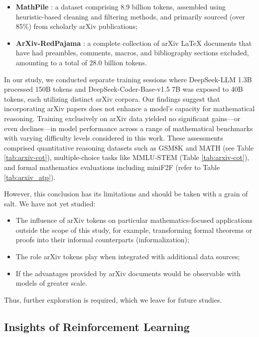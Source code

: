 \begin{itemize}[topsep=0pt]
\begin{itemize}[topsep=0pt]
\begin{itemize}[topsep=0pt]
    \item \textbf{MathPile} \citep{mathpile}: a dataset comprising 8.9 billion tokens, assembled using heuristic-based cleaning and filtering methods, and primarily sourced (over 85\%) from scholarly arXiv publications;
    \item \textbf{ArXiv-RedPajama} \citep{redpajama}: a complete collection of arXiv LaTeX documents that have had preambles, comments, macros, and bibliography sections excluded, amounting to a total of 28.0 billion tokens.
\end{itemize}

In our study, we conducted separate training sessions where DeepSeek-LLM 1.3B processed 150B tokens and DeepSeek-Coder-Base-v1.5 7B was exposed to 40B tokens, each utilizing distinct arXiv corpora. Our findings suggest that incorporating arXiv papers does not enhance a model’s capacity for mathematical reasoning. Training exclusively on arXiv data yielded no significant gains—or even declines—in model performance across a range of mathematical benchmarks with varying difficulty levels considered in this work. These assessments comprised quantitative reasoning datasets such as GSM8K and MATH (see Table \ref{tab:arxiv-cot}), multiple-choice tasks like MMLU-STEM (Table \ref{tab:arxiv-cot}), and formal mathematics evaluations including miniF2F (refer to Table \ref{tab:arxiv_atp}).

However, this conclusion has its limitations and should be taken with a grain of salt. We have not yet studied:

\begin{itemize}[topsep=0pt]
    \item The influence of arXiv tokens on particular mathematics-focused applications outside the scope of this study, for example, transforming formal theorems or proofs into their informal counterparts (informalization);
    \item The role arXiv tokens play when integrated with additional data sources;
    \item If the advantages provided by arXiv documents would be observable with models of greater scale.
\end{itemize}

Thus, further exploration is required, which we leave for future studies.

\subsection{Insights of Reinforcement Learning}

\end{itemize}
\end{itemize}
